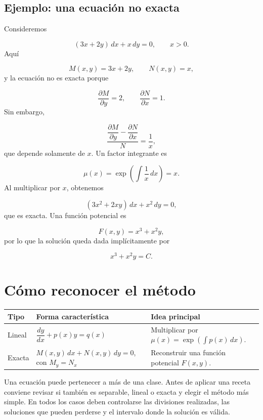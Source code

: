 \documentclass[12pt,a4paper]{article}
\begin{document}
	\subsection{Ejemplo: una ecuación no exacta}

	Consideremos

	\[
	(3x+2y)\,dx+x\,dy=0,
	\qquad x>0.
	\]
	Aquí

	\[
	M(x,y)=3x+2y,
	\qquad
	N(x,y)=x,
	\]
	y la ecuación no es exacta porque

	\[
	\frac{\partial M}{\partial y}=2,
	\qquad
	\frac{\partial N}{\partial x}=1.
	\]
	Sin embargo,

	\[
	\frac{\dfrac{\partial M}{\partial y}-\dfrac{\partial N}{\partial x}}{N}
	=
	\frac{1}{x},
	\]
	que depende solamente de \(x\). Un factor integrante es

	\[
	\mu(x)=\exp\left(\int\frac{1}{x}\,dx\right)=x.
	\]
	Al multiplicar por \(x\), obtenemos

	\[
	(3x^2+2xy)\,dx+x^2\,dy=0,
	\]
	que es exacta. Una función potencial es

	\[
	F(x,y)=x^3+x^2y,
	\]
	por lo que la solución queda dada implícitamente por

	\[
	\boxed{x^3+x^2y=C.}
	\]

	\clearpage
	\section{Cómo reconocer el método}

	\begin{center}
	\begin{tabularx}{\textwidth}{@{}
		>{\raggedright\arraybackslash}p{}
		>{\raggedright\arraybackslash}X
		>{\raggedright\arraybackslash}X@{}}
		\toprule
		\textbf{Tipo} & \textbf{Forma característica} & \textbf{Idea principal} \\
		\midrule
		Lineal &
		\(\dfrac{dy}{dx}+p(x)y=q(x)\) &
		Multiplicar por \(\mu(x)=\exp(\int p(x)\,dx)\). \\
		\addlinespace
		Exacta &
		\(M(x,y)\,dx+N(x,y)\,dy=0\), con \(M_y=N_x\) &
		Reconstruir una función potencial \(F(x,y)\). \\
		\bottomrule
	\end{tabularx}
	\end{center}

	Una ecuación puede pertenecer a más de una clase. Antes de aplicar una receta conviene revisar si también es separable, lineal o exacta y elegir el método más simple. En todos los casos deben controlarse las divisiones realizadas, las soluciones que pueden perderse y el intervalo donde la solución es válida.
\end{document}
